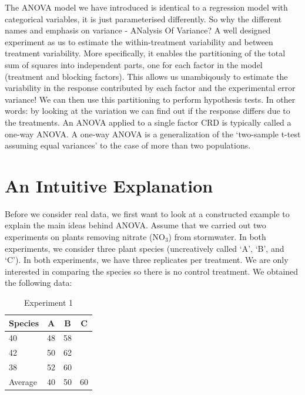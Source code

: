 \documentclass[
  letterpaper,
  DIV=11,
  numbers=noendperiod,
  oneside]{scrreprt}
\begin{document}
The ANOVA model we have introduced is identical to a regression model
with categorical variables, it is just parameterised differently. So why
the different names and emphasis on variance - ANalysis Of Variance? A
well designed experiment as us to estimate the within-treatment
variability and between treatment variability. More specifically, it
enables the partitioning of the total sum of squares into independent parts, one for
each factor in the model (treatment and blocking factors). This allows
us unambiqously to estimate the variability in the response contributed
by each factor and the experimental error variance! We can then use this
partitioning to perform hypothesis tests. In other words: by looking at
the variation we can find out if the response differs due to the
treatments. An ANOVA applied to a single factor CRD is typically called
a one-way ANOVA. A one-way ANOVA is a generalization of the `two-sample
t-test assuming equal variances' to the case of more than two
populations.

\section{An Intuitive Explanation}\label{an-intuitive-explanation}

Before we consider real data, we first want to look at a constructed
example to explain the main ideas behind ANOVA. Assume that we carried
out two experiments on plants removing nitrate (NO\(_3\)) from
stormwater. In both experiments, we consider three plant species
(uncreatively called `A', `B', and `C'). In both experiments, we have
three replicates per treatment. We are only interested in comparing the
species so there is no control treatment. We obtained the following
data:

\begin{table}[h]
    \centering
    \begin{tabular}{lccc}
        \toprule
        Species & A & B & C \\
        \midrule
        40 & 48 & 58 \\
        42 & 50 & 62 \\
        38 & 52 & 60 \\
        \midrule
        Average & 40 & 50 & 60 \\
        \bottomrule
    \end{tabular}
    \caption{Experiment 1}
\end{table}
\end{document}
